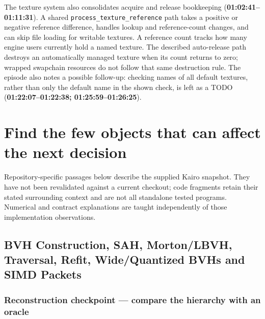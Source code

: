 The texture system also consolidates acquire and release bookkeeping (\textbf{01:02:41--01:11:31}). A shared \texttt{process\_texture\_reference} path takes a positive or negative reference difference, handles lookup and reference-count changes, and can skip file loading for writable textures. A reference count tracks how many engine users currently hold a named texture. The described auto-release path destroys an automatically managed texture when its count returns to zero; wrapped swapchain resources do not follow that same destruction rule. The episode also notes a possible follow-up: checking names of all default textures, rather than only the default name in the shown check, is left as a TODO (\textbf{01:22:07--01:22:38; 01:25:59--01:26:25}).

\section{Find the few objects that can affect the next decision}\label{06-engine-ii-ch027-find-the-few-objects-that-can-affect-the-next-decision}

\hypertarget{06-engine-ii-ch027-find-the-few-objects-that-can-affect-the-next-decision}{}

Repository-specific passages below describe the supplied Kairo snapshot. They have not been revalidated against a current checkout; code fragments retain their stated surrounding context and are not all standalone tested programs. Numerical and contract explanations are taught independently of those implementation observations.

\subsection{BVH Construction, SAH, Morton/LBVH, Traversal, Refit, Wide/Quantized BVHs and SIMD Packets}\label{06-engine-ii-ch027-bvh-construction-sah-mortonlbvh-traversal-refit-widequantized-bvhs-and-simd-packets}

\hypertarget{06-engine-ii-ch027-bvh-construction-sah-mortonlbvh-traversal-refit-widequantized-bvhs-and-simd-packets}{}

\subsubsection{Reconstruction checkpoint --- compare the hierarchy with an oracle}\label{06-engine-ii-ch027-reconstruction-checkpoint-compare-the-hierarchy-with-an-oracle}

\hypertarget{06-engine-ii-ch027-reconstruction-checkpoint-compare-the-hierarchy-with-an-oracle}{}

